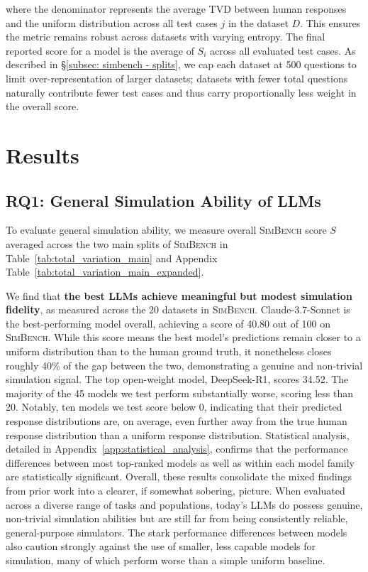 \documentclass{article} %
\begin{document}
where the denominator represents the average TVD between human responses and the uniform distribution across all test cases $j$ in the dataset $D$. This ensures the metric remains robust across datasets with varying entropy. The final reported score for a model is the average of $S_i$ across all evaluated test cases. As described in \S\ref{subsec: simbench - splits}, we cap each dataset at 500 questions to limit over-representation of larger datasets; datasets with fewer total questions naturally contribute fewer test cases and thus carry proportionally less weight in the overall score.











\section{Results}
\label{Results}


\subsection{RQ1: General Simulation Ability of LLMs}
\label{sec:overall_feasibility}
To evaluate general simulation ability, we measure overall \textsc{SimBench} score $S$ averaged across the two main splits of \textsc{SimBench} in Table~\ref{tab:total_variation_main} and Appendix Table~\ref{tab:total_variation_main_expanded}.

We find that \textbf{the best LLMs achieve meaningful but modest simulation fidelity}, as measured across the 20 datasets in \textsc{SimBench}.
Claude-3.7-Sonnet is the best-performing model overall, achieving a score of 40.80 out of 100 on \textsc{SimBench}.
While this score means the best model's predictions remain closer to a uniform distribution than to the human ground truth, it nonetheless closes roughly 40\% of the gap between the two, demonstrating a genuine and non-trivial simulation signal.
The top open-weight model, DeepSeek-R1, scores 34.52.
The majority of the 45 models we test perform substantially worse, scoring less than 20.
Notably, ten models we test score below 0, indicating that their predicted response distributions are, on 
average, even further away from the true human response distribution than a uniform response distribution. 
Statistical analysis, detailed in Appendix~\ref{app:statistical_analysis}, confirms that the performance differences between most top-ranked models as well as within each model family are statistically significant.
Overall, these results consolidate the mixed findings from prior work into a clearer, if somewhat sobering, picture. When evaluated across a diverse range of tasks and populations, today’s LLMs do possess genuine, non-trivial simulation abilities but are still far from being consistently reliable, general-purpose simulators. The stark performance differences between models also caution strongly against the use of smaller, less capable models for simulation, many of which perform worse than a simple uniform baseline.
\end{document}
